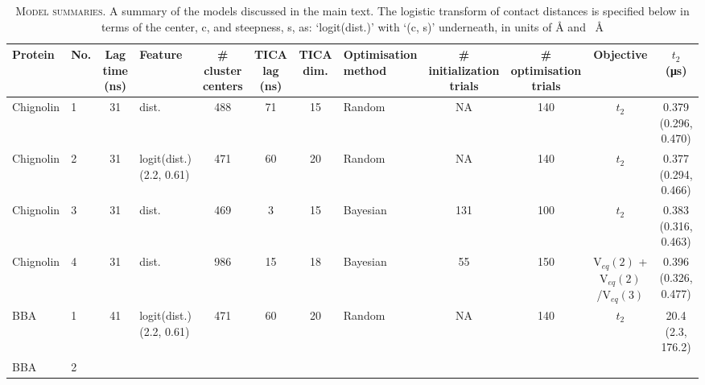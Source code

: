 \documentclass{article}
\begin{document}
\begin{landscape}

\begin{table}
    \centering
    \caption{\textsc{Model summaries.} A summary of the models discussed in the main text. The logistic transform of contact distances is specified below in terms of the center, c, and steepness, s, as: `logit(dist.)' with `(c, s)' underneath, in units of \si{\angstrom} and \si{\per\angstrom}}
    \begin{tabularx}{\hsize}{llclccclcccc}
    \toprule
    Protein & No. & \thead{Lag time \\ (\si{\nano\second})} & Feature & \thead{\# cluster \\ centers} & \thead{TICA lag \\ (\si{\nano\second})} & TICA dim. & \thead{Optimisation \\ method } & \thead{\# initialization \\ trials} & \thead{\# optimisation \\ trials }& Objective & \thead{$t_2$ \\ (\si{\micro\second})} \\
    \midrule
     Chignolin    & 1 & 31 & dist. & 488 & 71 & 15 & Random & NA & 140 & $t_{2}$ & \makecell[tc]{0.379 \\ (0.296, 0.470)} \\
     Chignolin    & 2 & 31 & \makecell[tl]{logit(dist.)\\(2.2, 0.61)} & 471 & 60 & 20 & Random & NA & 140 & $t_{2}$ & \makecell[tc]{0.377 \\ (0.294, 0.466)}  \\
     Chignolin    & 3 & 31 & dist. & 469 & 3 & 15 & Bayesian & 131 & 100 & $t_{2}$ & \makecell[tc]{0.383 \\ (0.316, 0.463)}  \\
     
     Chignolin    & 4 & 31 & dist. & 986 & 15 & 18 & Bayesian & 55 & 150 & \makecell[tc]{V$_{eq}(2)$ \\+ V$_{eq}(2)$/V$_{eq}(3)$} & \makecell[tc]{0.396 \\ (0.326, 0.477)}  \\
     
     BBA          & 1 & 41 & \makecell[tl]{logit(dist.)\\(2.2, 0.61)} & 471 & 60 & 20 & Random & NA & 140 & $t_{2}$ &\makecell[tc]{20.4 \\ (2.3, 176.2)} \\
     BBA          & 2 
     

\end{tabularx}
\end{table}
\end{landscape}
\end{document}
